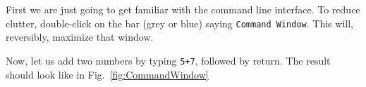 First we are just going to get familiar with the command line interface.
To reduce clutter, double-click on the bar (grey or blue) saying \lstinline{Command Window}. This will, reversibly, maximize that window.

Now, let us add two numbers by typing \lstinline{5+7}, followed by return.
The result should look like in Fig.~\ref{fig:CommandWindow}